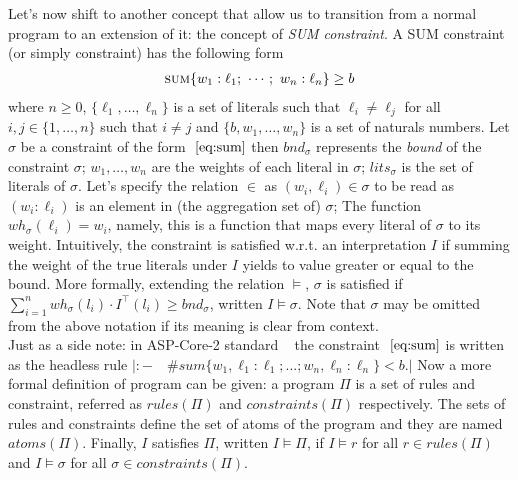 Let's now shift to another concept that allow us to 
transition from a normal program to an extension of it: the concept of \textit{SUM constraint}.
A SUM constraint (or simply constraint) has the following form
\begin{align}\label{eq:sum}
    \textsc{sum}\{w_1 : \ell_1;\ \cdots;\ w_n : \ell_n\} \geq b
\end{align}
where $n \ge 0$, $\{\ell_1, \hdots, \ell_n\}$ is a set of literals such that 
$\ell_i \ne \ell_j$ for all $i,j \in \{1, \hdots, n\}$ such that $i \ne j$
and $\{b, w_1, \hdots, w_n \}$ is a set of naturals numbers.
Let $\sigma$  be a constraint of the form $~\ref{eq:sum}$ then $\mathit{bnd}_{\sigma}$
represents the \textit{bound} of the constraint $\sigma$; $w_1, \hdots, w_n$
are the weights of each literal in $\sigma$; $lits_{\sigma}$ is the set of literals of $\sigma$.
Let's specify the relation $\in$ as $(w_i, \ell_i) \in \sigma$ to be read  
as $(w_i : \ell_i)$ is an element in (the aggregation set of) $\sigma$;
The function $\mathit{wh_{\sigma}}(\ell_i) = w_i$, namely, this is a function that 
maps every literal of $\sigma$ to its weight.
Intuitively, the constraint is satisfied w.r.t. an interpretation $I$ 
if summing the weight of the true literals under $I$ yields to value greater or equal to the bound.
More formally, extending the relation $\models$, $\sigma$ is satisfied if 
$\sum_{i=1}^{n} \mathit{wh}_{\sigma}(l_i) \cdot I^{\top}(l_i) \ge \mathit{bnd}_{\sigma}$,
written $I \models \sigma$.
Note that $\sigma$ may be omitted from the above notation if its meaning is clear from context.\\
Just as a side note: in ASP-Core-2 standard
~\cite{DBLP:journals/tplp/CalimeriFGIKKLM20} 
the constraint  $~\ref{eq:sum}$ is written as the headless rule
$|:- \quad \#sum\{w_1,\ell_1 : \ell_1; ...; w_n,\ell_n : \ell_n\} < b.|$ 
Now a more formal definition of program can be given:
a program $\Pi$ is a set of rules and constraint, referred as $\mathit{rules}(\Pi)$ 
and $\mathit{constraints}(\Pi)$ respectively.
The sets of rules and constraints define the set of atoms of the program and they are named $\mathit{atoms}(\Pi)$.
Finally, $I$ satisfies $\Pi$, written $I \models \Pi$, if $I \models r$ for all $r \in \mathit{rules}(\Pi)$
and $I \models \sigma$ for all $\sigma \in \mathit{constraints}(\Pi)$.

